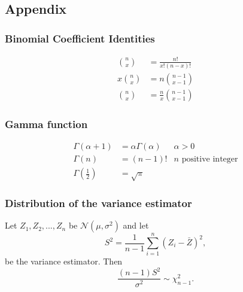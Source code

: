 \documentclass{article}
\theoremstyle{plain}
\theoremstyle{definition}
\theoremstyle{plain}
\theoremstyle{plain}
\begin{document}
\begin{multicols}{2}
\newpage

\newpage
\appendix

\section{Appendix}

\subsubsection*{Binomial Coefficient Identities}

\begin{align}
  \binom{n}{x} &= \frac{n!}{x!(n-x)!}
  \\
  x \binom{n}{x} &= n \binom{n - 1}{x - 1}
  \\
  \binom{n}{x} &= \frac{n}{x} \binom{n - 1}{x - 1}
\end{align}

\subsubsection*{Gamma function}

\begin{align}
  \Gamma(\alpha + 1) &= \alpha \Gamma(\alpha) &\alpha > 0
  \\
  \Gamma(n) &= (n - 1)! & n \text{ positive integer}
  \\
  \Gamma \left( \frac{1}{2} \right) &= \sqrt{\pi}
\end{align}

\subsubsection*{Distribution of the variance estimator}
Let $Z_1, Z_2, ..., Z_n$ be $\mathcal{N}(\mu, \sigma^{2})$
and let
\[
  S^2 = \frac{1}{n-1} \sum_{i = 1}^{n} (Z_i - \bar{Z})^{2},
\]
be the variance estimator.
Then
\[
  \frac{(n-1)S^2}{\sigma^{2}} \sim \chi^2_{n-1}.
\]

\end{multicols}
\end{document}

